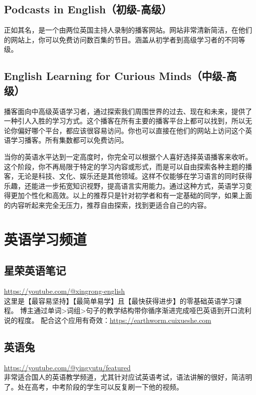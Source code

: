 \documentclass[11pt]{article}
\begin{document}
\subsection{Podcasts in English（初级-高级）}
\label{sec:orged54d63}
正如其名，是一个由两位英国主持人录制的播客网站。网站非常清新简洁，在他们的网站上，你可以免费访问数百集的节目。涵盖从初学者到高级学习者的不同等级。

\subsection{English Learning for Curious Minds（中级-高级）}
\label{sec:org03585b5}
播客面向中高级英语学习者，通过探索我们周围世界的过去、现在和未来，提供了一种引人入胜的学习方式。这个播客在所有主要的播客平台上都可以找到，所以无论你偏好哪个平台，都应该很容易访问。你也可以直接在他们的网站上访问这个英语学习播客。所有集数都可以免费访问。

当你的英语水平达到一定高度时，你完全可以根据个人喜好选择英语播客来收听。这个阶段，你不再局限于特定的学习内容或形式，而是可以自由探索各种主题的播客，无论是科技、文化、娱乐还是其他领域。这样不仅能够在学习语言的同时获得乐趣，还能进一步拓宽知识视野，提高语言实用能力。通过这种方式，英语学习变得更加个性化和高效。以上的推荐只是针对初学者和有一定基础的同学，如果上面的内容听起来完全无压力，推荐自由探索，找到更适合自己的内容。

\section{英语学习频道}
\label{sec:org0ee9318}
\subsection{星荣英语笔记}
\label{sec:org38372f6}
\url{https://youtube.com/@xingrong-english} \\
这里是【最容易坚持】【最简单易学】且【最快获得进步】的零基础英语学习课程。
博主通过单词>词组>句子的教学结构带你循序渐进完成哑巴英语到开口流利说的程度。
配合这个应用有奇效：\url{https://earthworm.cuixueshe.com}

\subsection{英语兔}
\label{sec:orgff91406}
\url{https://youtube.com/@yingyutu/featured} \\
非常适合国人的英语教学频道，尤其针对应试英语考试，语法讲解的很好，简洁明了。处在高考，中考阶段的学生可以反复刷一下他的视频。
\end{document}
